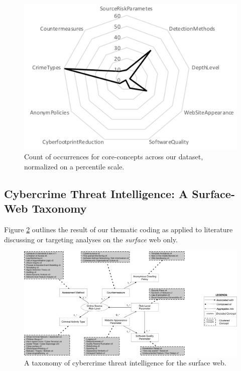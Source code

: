 \begin{figure}
\begin{center}
\includegraphics[scale=0.4]{codescount.png}
\end{center}
\caption{Count of occurrences for core-concepts across our dataset, normalized on a percentile scale.}\label{codescount}
\end{figure}

\subsection{Cybercrime Threat Intelligence: A Surface-Web Taxonomy}

Figure \ref{taxo1} outlines the result of our thematic coding as applied to literature discussing or targeting analyses on the \emph{surface} web only.

\begin{figure}
\begin{center}
\includegraphics[scale=0.3]{./img/taxo1.pdf}
\end{center}
\caption{A taxonomy of cybercrime threat intelligence for the surface web.}\label{taxo1}
\end{figure}




